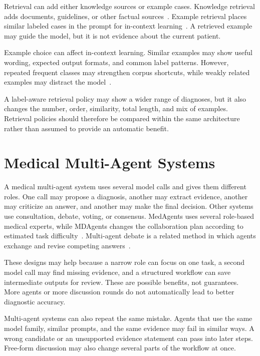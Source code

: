 Retrieval can add either knowledge sources or example cases. Knowledge retrieval adds documents, guidelines, or other factual sources~\citep{lewis2020rag}. Example retrieval places similar labeled cases in the prompt for in-context learning~\citep{liu2022incontext}. A retrieved example may guide the model, but it is not evidence about the current patient.

Example choice can affect in-context learning. Similar examples may show useful wording, expected output formats, and common label patterns. However, repeated frequent classes may strengthen corpus shortcuts, while weakly related examples may distract the model~\citep{liu2022incontext}.

A label-aware retrieval policy may show a wider range of diagnoses, but it also changes the number, order, similarity, total length, and mix of examples. Retrieval policies should therefore be compared within the same architecture rather than assumed to provide an automatic benefit.

\section{Medical Multi-Agent Systems}

A medical multi-agent system uses several model calls and gives them different roles. One call may propose a diagnosis, another may extract evidence, another may criticize an answer, and another may make the final decision. Other systems use consultation, debate, voting, or consensus. MedAgents uses several role-based medical experts, while MDAgents changes the collaboration plan according to estimated task difficulty~\citep{tang2024medagents,kim2024mdagents}. Multi-agent debate is a related method in which agents exchange and revise competing answers~\citep{du2024debate}.

These designs may help because a narrow role can focus on one task, a second model call may find missing evidence, and a structured workflow can save intermediate outputs for review. These are possible benefits, not guarantees. More agents or more discussion rounds do not automatically lead to better diagnostic accuracy.

Multi-agent systems can also repeat the same mistake. Agents that use the same model family, similar prompts, and the same evidence may fail in similar ways. A wrong candidate or an unsupported evidence statement can pass into later steps. Free-form discussion may also change several parts of the workflow at once.


